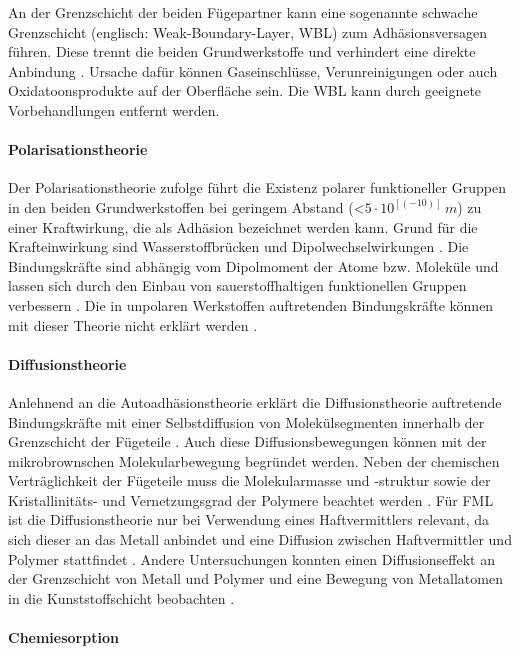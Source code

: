 An der Grenzschicht der beiden Fügepartner kann eine sogenannte schwache Grenzschicht (englisch: Weak-Boundary-Layer, WBL) zum Adhäsionsversagen führen. Diese trennt die beiden Grundwerkstoffe und verhindert eine direkte Anbindung \cite{Schroer.1994}. Ursache dafür können Gaseinschlüsse, Verunreinigungen oder auch Oxidatoonsprodukte auf der Oberfläche sein. Die WBL kann durch geeignete Vorbehandlungen entfernt werden. \cite{Flock.b}

\paragraph{Polarisationstheorie}

Der Polarisationstheorie zufolge führt die Existenz polarer funktioneller Gruppen in den beiden Grundwerkstoffen bei geringem Abstand (<$5\cdot10^[(-10)] \, m$) zu einer Kraftwirkung, die als Adhäsion bezeichnet werden kann. Grund für die Krafteinwirkung sind Wasserstoffbrücken und Dipolwechselwirkungen \cite{Weiss.2002}. Die Bindungskräfte sind abhängig vom Dipolmoment der Atome bzw. Moleküle und lassen sich durch den Einbau von sauerstoffhaltigen funktionellen Gruppen verbessern \cite{Garbassi.1998}. Die in unpolaren Werkstoffen auftretenden Bindungskräfte können mit dieser Theorie nicht erklärt werden \cite{Habenicht.2009}. 

\paragraph{Diffusionstheorie}

Anlehnend an die Autoadhäsionstheorie erklärt die Diffusionstheorie auftretende Bindungskräfte mit einer Selbstdiffusion von Molekülsegmenten innerhalb der Grenzschicht der Fügeteile \cite{Gromov.1963}. Auch diese Diffusionsbewegungen können mit der mikrobrownschen Molekularbewegung begründet werden. Neben der chemischen Verträglichkeit der Fügeteile muss die Molekularmasse und -struktur sowie der Kristallinitäts- und Vernetzungsgrad der Polymere 
beachtet werden \cite{Habenicht.2009}. Für FML ist die Diffusionstheorie nur bei Verwendung eines Haftvermittlers relevant,  da sich dieser an das Metall anbindet und eine Diffusion zwischen Haftvermittler und Polymer stattfindet \cite{Suchentrunk.2007}. Andere Untersuchungen konnten einen Diffusionseffekt an der Grenzschicht von Metall und Polymer und eine Bewegung von Metallatomen in die Kunststoffschicht beobachten \cite{Faupel.2003}.

\paragraph{Chemiesorption}

